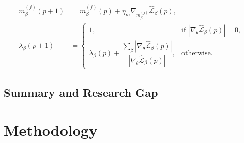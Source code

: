 \documentclass[11pt, a4paper]{article}
\newcommand{\todo}[1]{\textcolor{red}{\textbf{[TODO: #1]}}}
\begin{document}
\begin{align}
    m_\beta^{(j)}(p+1) &= m_\beta^{(j)}(p) + \eta_m \nabla_{m_\beta^{(j)}} \hat{\mathcal{L}}_\beta(p), \label{eq:dcpinn-whack1} \\
    \lambda_\beta(p+1) &=
    \begin{cases}
        1, & \text{if } \left| \nabla_\theta \hat{\mathcal{L}}_\beta(p) \right| = 0, \\[4pt]
        \lambda_\beta(p) + \dfrac{\sum_\beta \left| \nabla_\theta \hat{\mathcal{L}}_\beta(p) \right|}{\left| \nabla_\theta \hat{\mathcal{L}}_\beta(p) \right|}, & \text{otherwise.}
    \end{cases} \label{eq:dcpinn-whack2}
\end{align}

\subsection{Summary and Research Gap}
\label{sec:lit_gap}




\section{Methodology}
\label{sec:methodology}
\end{document}
